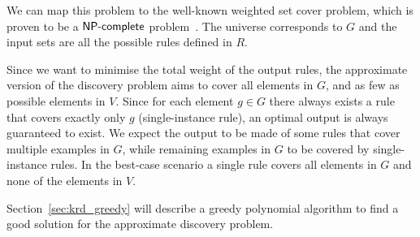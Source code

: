 We can map this problem to the well-known weighted set cover problem, which is proven to be a $\textsf{NP\mbox{-}complete}$ problem~\cite{chvatal1979greedy}. The universe corresponds to $G$ and the input sets are all the possible rules defined in $R$.

Since we want to minimise the total weight of the output rules, the approximate version of the discovery problem aims to cover all elements in $G$, and as few as possible elements in $V$. Since for each element $g \in G$ there always exists a rule that covers exactly only $g$ (single-instance rule), an optimal output is always guaranteed to exist. We expect the output to be made of some rules that cover multiple examples in $G$, while remaining examples in $G$ to be covered by single-instance rules. In the best-case scenario a single rule covers all elements in $G$ and none of the elements in $V$.

Section~\ref{sec:krd_greedy} will describe a greedy polynomial algorithm to find a good solution for the approximate discovery problem.

